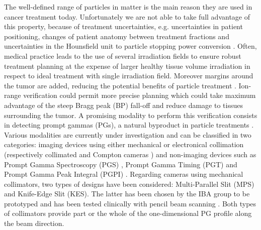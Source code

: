 \documentclass[a4paper,english,12pt]{article}
\begin{document}
The well-defined range of particles in matter is the main reason they are used in cancer treatment today. Unfortunately we are not able to take full advantage of this property, because of treatment uncertainties, e.g. uncertainties in patient positioning, changes of patient anatomy between treatment fractions and uncertainties in the Hounsfield unit to particle stopping power conversion \citep{Paganetti2012}. Often, medical practice leads to the use of several irradiation fields to ensure robust treatment planning at the expense of larger healthy tissue volume irradiation in respect to ideal treatment with single irradiation field. Moreover margins around the tumor are added, reducing the potential benefits of particle treatment \citep{Knopf2013}. Ion-range verification could permit more precise planning which could take maximum advantage of the steep Bragg peak (BP) fall-off and reduce damage to tissues surrounding the tumor. A promising modality to perform this verification consists in detecting prompt gammas (PGs), a natural byproduct in particle treatments \citep{Krimmer2017a, Parodi2018}. Various modalities are currently under investigation and can be classified in two categories: imaging devices using either mechanical or electronical collimation (respectively collimated \citep{Perali2014, Min2012, Pinto2014a} and Compton cameras \citep{Krimmer2015,Kurosawa2012,Thirolf2016,Polf2015,Llosa2016}) and non-imaging devices such as Prompt Gamma Spectroscopy (PGS) \citep{Hueso-Gonzalez2016}, Prompt Gamma Timing (PGT) \citep{Pausch2016} and Prompt Gamma Peak Integral (PGPI) \citep{Krimmer2017}. Regarding cameras using mechanical collimators, two types of designs have been considered: Multi-Parallel Slit (MPS) and Knife-Edge Slit (KES). The latter has been chosen by the IBA group to be prototyped and has been tested clinically with pencil beam scanning \citep{Xie2017}. Both types of collimators provide part or the whole of the one-dimensional PG profile along the beam direction.
\end{document}
